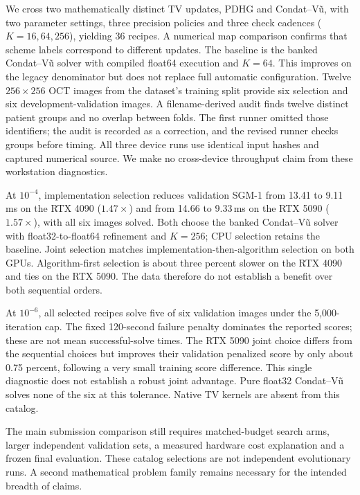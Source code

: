 We cross two mathematically distinct TV updates, PDHG and Condat--V\~u, with
two parameter settings, three precision policies and three check cadences
($K=16,64,256$), yielding 36 recipes. A numerical map comparison confirms that
scheme labels correspond to different updates. The baseline is the banked
Condat--V\~u solver with compiled float64 execution and $K=64$. This improves
on the legacy denominator but does not replace full automatic configuration.
Twelve $256\times256$ OCT images from the dataset's training split provide six
selection and six development-validation images. A filename-derived audit
finds twelve distinct patient groups and no overlap between folds. The first
runner omitted those identifiers; the audit is recorded as a correction, and
the revised runner checks groups before timing. All three device runs use
identical input hashes and captured numerical source. We make no cross-device
throughput claim from these workstation diagnostics.



At $10^{-4}$, implementation selection reduces validation SGM-1 from 13.41
to 9.11\,ms on the RTX 4090 ($1.47\times$) and from 14.66 to 9.33\,ms on
the RTX 5090 ($1.57\times$), with all six images solved. Both choose the
banked Condat--V\~u solver with float32-to-float64 refinement and $K=256$;
CPU selection retains the baseline. Joint selection matches
implementation-then-algorithm selection on both GPUs. Algorithm-first
selection is about three percent slower on the RTX 4090 and ties on the
RTX 5090. The data therefore do not establish a benefit over both sequential
orders.

At $10^{-6}$, all selected recipes solve five of six validation images under
the 5,000-iteration cap. The fixed 120-second failure penalty dominates
the reported scores; these are not mean successful-solve times. The RTX 5090
joint choice differs from the sequential choices but improves their validation
penalized score by only about 0.75 percent, following a very small training
score difference. This single diagnostic does not establish a robust joint
advantage. Pure float32 Condat--V\~u solves none of the six at this tolerance.
Native TV kernels are absent from this catalog.

The main submission comparison still requires matched-budget search arms,
larger independent validation sets, a measured hardware cost explanation and
a frozen final evaluation. These catalog selections are not independent
evolutionary runs. A second mathematical problem family remains necessary
for the intended breadth of claims.
